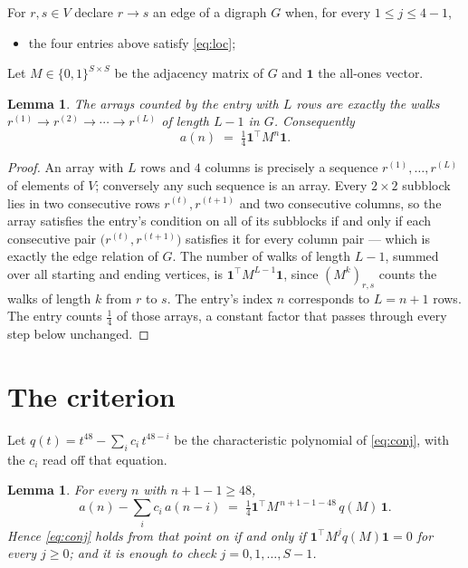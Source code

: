 \documentclass[11pt,a4paper]{article}
\theoremstyle{plain}
\newtheorem{lemma}[theorem]{Lemma}
\theoremstyle{definition}
\begin{document}
For $r,s\in V$ declare $r\to s$ an edge of a digraph $G$ when, for every
$1\le j\le 4-1$,
\begin{itemize}
\item the four entries above satisfy \eqref{eq:loc};

\end{itemize}
Let $M\in\{0,1\}^{S\times S}$ be the adjacency matrix of $G$ and $\mathbf{1}$ the
all-ones vector.

\begin{lemma}\label{lem:walk}
The arrays counted by the entry with $L$ rows are exactly the walks
$r^{(1)}\to r^{(2)}\to\cdots\to r^{(L)}$ of length $L-1$ in $G$. Consequently
\[
a(n)\;=\;\tfrac1{4}\mathbf{1}^{\!\top}M^{n}\mathbf{1} .
\]
\end{lemma}

\begin{proof}
An array with $L$ rows and $4$ columns is precisely a sequence
$r^{(1)},\dots,r^{(L)}$ of elements of $V$; conversely any such sequence is an array.
Every $2\times2$ subblock lies in two consecutive rows $r^{(t)},r^{(t+1)}$ and two
consecutive columns, so the array satisfies the entry's condition on all of its subblocks
if and only if each consecutive pair $\bigl(r^{(t)},r^{(t+1)}\bigr)$ satisfies it for
every column pair --- which is exactly the edge relation of $G$. The number of walks of
length $L-1$, summed over all starting and ending vertices, is
$\mathbf{1}^{\!\top}M^{L-1}\mathbf{1}$, since $(M^{k})_{r,s}$ counts the walks of
length $k$ from $r$ to $s$. The entry's index $n$ corresponds to $L=n+1$ rows. The entry counts $\tfrac1{4}$ of those arrays, a constant factor that passes through every step below unchanged.
\end{proof}

\section{The criterion}

Let $q(t)=t^{48}-\sum_i c_i\,t^{48-i}$ be the characteristic polynomial of
\eqref{eq:conj}, with the $c_i$ read off that equation.

\begin{lemma}\label{lem:crit}
For every $n$ with $n+1-1\ge48$,
\[
a(n)-\sum_i c_i\,a(n-i)\;=\;\tfrac1{4}\mathbf{1}^{\!\top}M^{\,n+1-1-48}\,q(M)\,\mathbf{1} .
\]
Hence \eqref{eq:conj} holds from that point on if and only if
$\mathbf{1}^{\!\top}M^{j}q(M)\mathbf{1}=0$ for every $j\ge0$; and it is enough to check
$j=0,1,\dots,S-1$.
\end{lemma}
\end{document}
